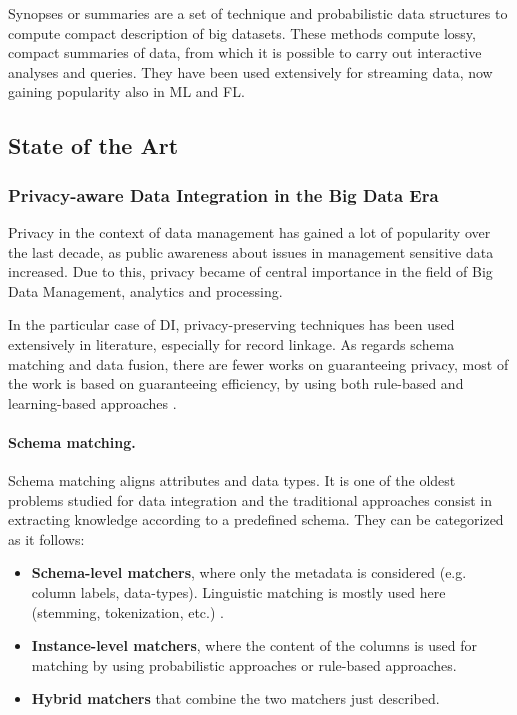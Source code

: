 \documentclass[12pt]{article}
\begin{document}
Synopses or summaries are a set of technique and probabilistic data structures to compute compact description of big datasets. 
These methods compute lossy, compact summaries of data, from which it is possible to carry out interactive analyses and queries. 
They have been used extensively for streaming data, now gaining popularity also in ML and FL.

\subsection{State of the Art}
\subsubsection{Privacy-aware Data Integration in the Big Data Era}
Privacy in the context of data management has gained a lot of popularity over the last decade, as public awareness about 
issues in management sensitive data increased. Due to this, privacy became of central importance in the field of Big Data 
Management, analytics and processing.

In the particular case of DI, privacy-preserving techniques
has been used extensively in literature, especially for record linkage. %
As regards schema matching and data fusion, there are fewer works on guaranteeing privacy, most of the work is based on guaranteeing efficiency, by using 
both rule-based and learning-based approaches \cite*{Rodrigues2021,Riedel2013,Saleem2009}.


\paragraph{Schema matching.}
Schema matching aligns attributes and data types. It is one of the oldest problems studied for data integration and the 
traditional approaches consist in extracting knowledge according to a predefined schema. They can be categorized as it follows:
\begin{itemize}
   \item \textbf{Schema-level matchers}, where only the metadata is considered (e.g. column labels, data-types). Linguistic matching is mostly used here (stemming, tokenization, etc.) \cite*{Bernstein2011}.
   \item \textbf{Instance-level matchers}, where the content of the columns is used for matching by using probabilistic approaches \cite*{Szymczak2016, Dasu2002} or rule-based approaches.
   \item \textbf{Hybrid matchers} that combine the two matchers just described.
\end{itemize}
\end{document}

